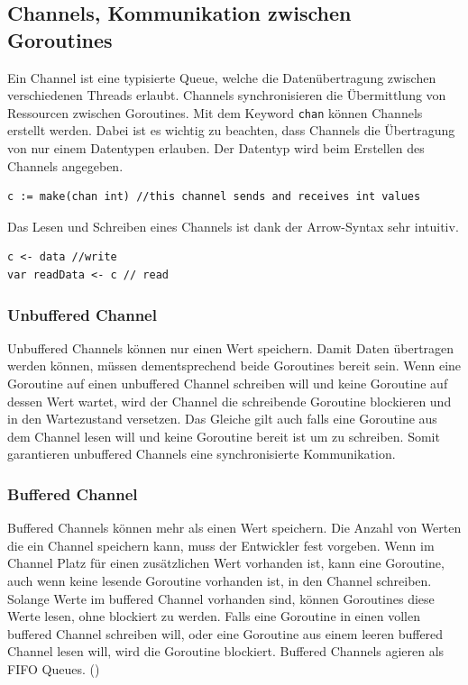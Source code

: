 \documentclass[11pt]{article}
\begin{document}
\subsection{Channels, Kommunikation zwischen Goroutines}\label{subsec:channels}
Ein Channel ist eine typisierte Queue, welche die Datenübertragung zwischen verschiedenen Threads erlaubt. Channels synchronisieren die Übermittlung von Ressourcen zwischen Goroutines. Mit dem Keyword \lstinline{chan} können Channels erstellt werden. Dabei ist es wichtig zu beachten, dass Channels die Übertragung von nur einem Datentypen erlauben. Der Datentyp wird beim Erstellen des Channels angegeben.

\begin{lstlisting}[caption= Erstellen eines Channels]
c := make(chan int) //this channel sends and receives int values
\end{lstlisting}

Das Lesen und Schreiben eines Channels ist dank der Arrow-Syntax sehr intuitiv. 
\begin{lstlisting}[caption=Lesen und Schreiben von Channels]
c <- data //write
var readData <- c // read
\end{lstlisting}

\subsubsection{Unbuffered Channel}
Unbuffered Channels können nur einen Wert speichern. Damit Daten übertragen werden können, müssen dementsprechend beide Goroutines bereit sein. Wenn eine Goroutine auf einen unbuffered Channel schreiben will und keine Goroutine auf dessen Wert wartet, wird der Channel die schreibende Goroutine blockieren und in den Wartezustand versetzen. Das Gleiche gilt auch falls eine Goroutine aus dem Channel lesen will und keine Goroutine bereit ist um zu schreiben. Somit garantieren unbuffered Channels eine synchronisierte Kommunikation.

\subsubsection{Buffered Channel}
Buffered Channels können mehr als einen Wert speichern. Die Anzahl von Werten die ein Channel speichern kann, muss der Entwickler fest vorgeben. Wenn im Channel Platz für einen zusätzlichen Wert vorhanden ist, kann eine Goroutine, auch wenn keine lesende Goroutine vorhanden ist, in den Channel schreiben.  Solange Werte im buffered Channel vorhanden sind, können Goroutines diese Werte lesen, ohne blockiert zu werden. Falls eine Goroutine in einen vollen buffered Channel schreiben will, oder eine Goroutine aus einem leeren buffered Channel lesen will, wird die Goroutine blockiert. Buffered Channels agieren als FIFO Queues. (\cite{Guney2018})
\end{document}
